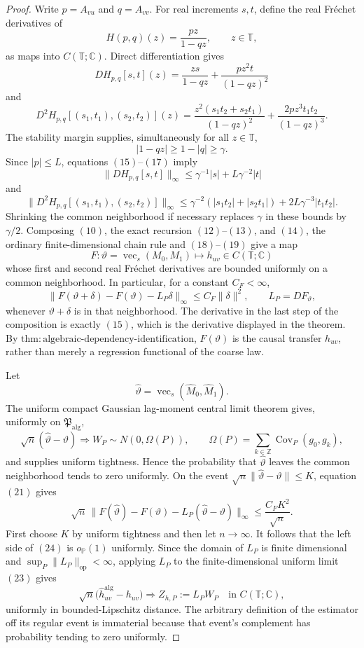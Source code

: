 \documentclass{article}
\begin{document}
\begin{proof}
Write \(p=A_{vu}\) and \(q=A_{vv}\).  For real increments \(s,t\), define the real Fr\'echet derivatives of
\[
 H(p,q)(z)=\frac{pz}{1-qz},\qquad z\in\mathbb T,
\tag{14}
\]
as maps into \(C(\mathbb T;\mathbb C)\).  Direct differentiation gives
\[
 DH_{p,q}[s,t](z)
 =\frac{zs}{1-qz}+\frac{pz^2t}{(1-qz)^2}
\tag{15}
\]
and
\[
 D^2H_{p,q}[(s_1,t_1),(s_2,t_2)](z)
 =\frac{z^2(s_1t_2+s_2t_1)}{(1-qz)^2}
  +\frac{2pz^3t_1t_2}{(1-qz)^3}.
\tag{16}
\]
The stability margin supplies, simultaneously for all \(z\in\mathbb T\),
\[
 |1-qz|\ge1-|q|\ge\gamma.
\tag{17}
\]
Since \(|p|\le L\), equations \((15)\)--\((17)\) imply
\[
 \|DH_{p,q}[s,t]\|_\infty
 \le\gamma^{-1}|s|+L\gamma^{-2}|t|
\tag{18}
\]
and
\[
 \|D^2H_{p,q}[(s_1,t_1),(s_2,t_2)]\|_\infty
 \le\gamma^{-2}(|s_1t_2|+|s_2t_1|)
   +2L\gamma^{-3}|t_1t_2|.
\tag{19}
\]
Shrinking the common neighborhood if necessary replaces \(\gamma\) in these bounds by \(\gamma/2\).  Composing \((10)\), the exact recursion \((12)\)--\((13)\), and \((14)\), the ordinary finite-dimensional chain rule and \((18)\)--\((19)\) give a map
\[
 F:\vartheta=\operatorname{vec}_{s}(M_0,M_1)\longmapsto h_{uv}
 \in C(\mathbb T;\mathbb C)
\tag{20}
\]
whose first and second real Fr\'echet derivatives are bounded uniformly on a common neighborhood.  In particular, for a constant \(C_F<\infty\),
\[
 \|F(\vartheta+\delta)-F(\vartheta)-L_P\delta\|_\infty
 \le C_F\|\delta\|^2,
 \qquad L_P=DF_\vartheta,
\tag{21}
\]
whenever \(\vartheta+\delta\) is in that neighborhood.  The derivative in the last step of the composition is exactly \((15)\), which is the derivative displayed in the theorem.  By \(\mathrm{thm{:}algebraic\mbox{-}dependency\mbox{-}identification}\), \(F(\vartheta)\) is the causal transfer \(h_{uv}\), rather than merely a regression functional of the coarse law.

Let
\[
 \widehat\vartheta
 =\operatorname{vec}_{s}(\widehat M_0,\widehat M_1).
\tag{22}
\]
The uniform compact Gaussian lag-moment central limit theorem gives, uniformly on \(\mathfrak P_{\mathrm{alg}}\),
\[
 \sqrt n(\widehat\vartheta-\vartheta)
 \Longrightarrow W_P\sim N(0,\Omega(P)),
 \qquad
 \Omega(P)=\sum_{k\in\mathbb Z}\operatorname{Cov}_P(g_0,g_k),
\tag{23}
\]
and supplies uniform tightness.  Hence the probability that \(\widehat\vartheta\) leaves the common neighborhood tends to zero uniformly.  On the event \(\sqrt n\|\widehat\vartheta-\vartheta\|\le K\), equation \((21)\) gives
\[
 \sqrt n\,
 \|F(\widehat\vartheta)-F(\vartheta)-L_P(\widehat\vartheta-\vartheta)\|_\infty
 \le\frac{C_FK^2}{\sqrt n}.
\tag{24}
\]
First choose \(K\) by uniform tightness and then let \(n\to\infty\).  It follows that the left side of \((24)\) is \(o_{\mathbb P}(1)\) uniformly.  Since the domain of \(L_P\) is finite dimensional and \(\sup_P\|L_P\|_{\mathrm{op}}<\infty\), applying \(L_P\) to the finite-dimensional uniform limit \((23)\) gives
\[
 \sqrt n\bigl(\widehat h_{uv}^{\mathrm{alg}}-h_{uv}\bigr)
 \Longrightarrow Z_{h,P}:=L_PW_P
 \quad\text{in }C(\mathbb T;\mathbb C),
\tag{25}
\]
uniformly in bounded-Lipschitz distance.  The arbitrary definition of the estimator off its regular event is immaterial because that event's complement has probability tending to zero uniformly.


\end{proof}
\end{document}
